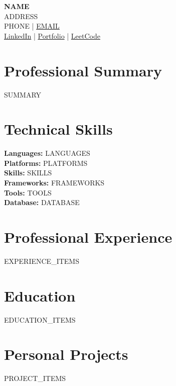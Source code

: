 \documentclass[11pt,a4paper]{article}
\begin{document}
\begin{center}
    \textbf{\huge {{NAME}}} \\
    \vspace{6pt}
    \small {{ADDRESS}} \\
    \small {{PHONE}} | \href{mailto:{{EMAIL}}}{{{EMAIL}}} \\
    \small \href{{{LINKEDIN}}}{LinkedIn} | \href{{{PORTFOLIO}}}{Portfolio} | \href{{{LEETCODE}}}{LeetCode}
\end{center}

\section{Professional Summary}
{{SUMMARY}}

\section{Technical Skills}
\begin{itemize}[leftmargin=0.15in, label={}]
    \small{\item{
     \textbf{Languages: }{{{LANGUAGES}}} \\
     \textbf{Platforms: }{{{PLATFORMS}}} \\
     \textbf{Skills: }{{{SKILLS}}} \\
     \textbf{Frameworks: }{{{FRAMEWORKS}}} \\
     \textbf{Tools: }{{{TOOLS}}} \\
     \textbf{Database: }{{{DATABASE}}}
    }}
\end{itemize}

\section{Professional Experience}
\begin{itemize}[leftmargin=0.15in, label={}]
{{EXPERIENCE_ITEMS}}
\end{itemize}

\section{Education}
\begin{itemize}[leftmargin=0.15in, label={}]
{{EDUCATION_ITEMS}}
\end{itemize}

\section{Personal Projects}
\begin{itemize}[leftmargin=0.15in, label={}]
{{PROJECT_ITEMS}}
\end{itemize}
\end{document}
